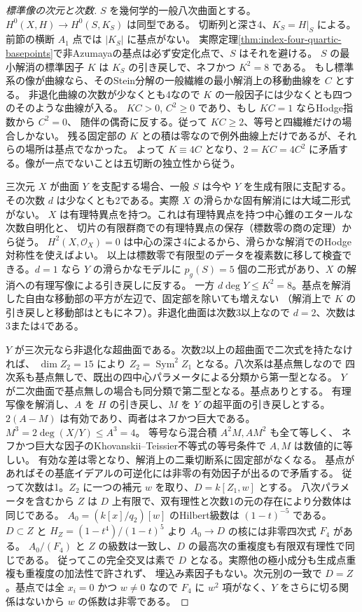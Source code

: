 \begin{proof}[標準像の次元と次数]
$S$ を幾何学的一般八次曲面とする。$H^0(X,H)\to H^0(S,K_S)$ は同型である。
切断列と深さ4、$K_S=H|_S$ による。前節の横断 $A_1$ 点では $|K_S|$ に基点がない。
実際定理\ref{thm:index-four-quartic-basepoints}で非Azumayaの基点は必ず安定化点で、$S$ はそれを避ける。
$S$ の最小解消の標準因子 $K$ は $K_S$ の引き戻しで、ネフかつ $K^2=8$ である。
もし標準系の像が曲線なら、そのStein分解の一般繊維の最小解消上の移動曲線を $C$ とする。
非退化曲線の次数が少なくとも4なので $K$ の一般因子には少なくとも四つのそのような曲線が入る。
$KC>0$, $C^2\ge0$ であり、もし $KC=1$ ならHodge指数から $C^2=0$、
随伴の偶奇に反する。従って $KC\ge2$、等号と四繊維だけの場合しかない。
残る固定部の $K$ との積は零なので例外曲線上だけであるが、それらの場所は基点でなかった。
よって $K\equiv4C$ となり、$2=KC=4C^2$ に矛盾する。像が一点でないことは五切断の独立性から従う。

三次元 $X$ が曲面 $Y$ を支配する場合、一般 $S$ は今や $Y$ を生成有限に支配する。
その次数 $d$ は少なくとも2である。実際 $X$ の滑らかな固有解消には大域二形式がない。
$X$ は有理特異点を持つ。これは有理特異点を持つ中心錐のエタールな次数自明化と、
切片の有限群商での有理特異点の保存（標数零の商の定理）から従う。
$H^2(X,\mathcal O_X)=0$ は中心の深さ4によるから、滑らかな解消でのHodge対称性を使えばよい。
以上は標数零で有限型のデータを複素数に移して検査できる。$d=1$ なら
$Y$ の滑らかなモデルに $p_g(S)=5$ 個の二形式があり、$X$ の解消への有理写像による引き戻しに反する。
一方 $d\deg Y\le K^2=8$。基点を解消した自由な移動部の平方が左辺で、固定部を除いても増えない
（解消上で $K$ の引き戻しと移動部はともにネフ）。非退化曲面は次数3以上なので $d=2$、次数は3または4である。

$Y$ が三次元なら非退化な超曲面である。次数2以上の超曲面で二次式を持たなければ、
$\dim Z_2=15$ により $Z_2=\operatorname{Sym}^2 Z_1$ となる。八次系は基点無しなので
四次系も基点無しで、既出の四中心パラメータによる分類から第一型となる。
$Y$ が二次曲面で基点無しの場合も同分類で第二型となる。基点ありとする。
有理写像を解消し、$A$ を $H$ の引き戻し、$M$ を $Y$ の超平面の引き戻しとする。
$2(A-M)$ は有効であり、両者はネフかつ巨大である。$M^3=2\deg(X/Y)\le A^3=4$。
等号なら混合積 $A^2M,AM^2$ も全て等しく、
ネフかつ巨大な因子のKhovanskii--Teissier不等式の等号条件で $A,M$ は数値的に等しい。
有効な差は零となり、解消上の二乗切断系に固定部がなくなる。
基点があればその基底イデアルの可逆化には非零の有効因子が出るので矛盾する。
従って次数は1。$Z_2$ に一つの補元 $w$ を取り、$D=k[Z_1,w]$ とする。
八次パラメータを含むから $Z$ は $D$ 上有限で、双有理性と次数1の元の存在により分数体は同じである。
$A_0=(k[x]/q_2)[w]$ のHilbert級数は $(1-t)^{-5}$ である。
$D\subset Z$ と $H_Z=(1-t^4)/(1-t)^5$ より $A_0\to D$ の核には非零四次式 $F_4$ がある。
$A_0/(F_4)$ と $Z$ の級数は一致し、$D$ の最高次の重複度も有限双有理性で同じである。
従ってこの完全交叉は素で $D$ となる。実際他の極小成分も生成点重複も重複度の加法性で許されず、
埋込み素因子もない。次元別の一致で $D=Z$。基点では全 $x_i=0$ かつ $w\ne0$ なので
$F_4$ に $w^2$ 項がなく、$Y$ をさらに切る関係はないから $w$ の係数は非零である。
\end{proof}

